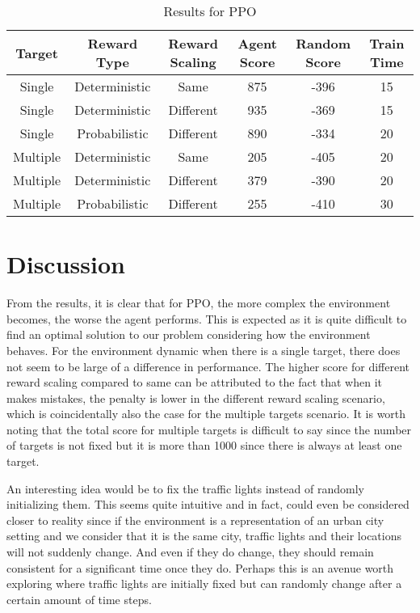 \documentclass{article}
\begin{document}
\begin{table*}[h]
	\centering
	\caption[]{Results for PPO}\label{Results for PPO}%
	\begin{tabular}{cccccc}
		\toprule
		Target & Reward Type & Reward Scaling\footnotemark[1] & Agent Score\footnotemark[2] & Random Score\footnotemark[2] & Train Time\footnotemark[3]\\
		\midrule
		Single &  Deterministic & Same & 875 & -396 & 15\\
		Single & Deterministic & Different\footnotemark[4] & 935 & -369 & 15\\
		Single & Probabilistic & Different & 890 & -334 & 20\\
		\midrule
		Multiple & Deterministic & Same & 205 & -405 & 20\\
		Multiple & Deterministic & Different & 379 & -390 & 20\\
		Multiple & Probabilistic & Different & 255 & -410 & 30\\
		\bottomrule
	\end{tabular}
	\label{tab: PPO_Table}
\end{table*}


\section{Discussion}
\label{discussion}
From the results, it is clear that for PPO, the more complex the environment becomes, the worse the agent performs. This is expected as it is quite difficult to find an optimal solution to our problem considering how the environment behaves. For the environment dynamic when there is a single target, there does not seem to be large of a difference in performance. The higher score for different reward scaling compared to same can be attributed to the fact that when it makes mistakes, the penalty is lower in the different reward scaling scenario, which is coincidentally also the case for the multiple targets scenario. It is worth noting that the total score for multiple targets is difficult to say since the number of targets is not fixed but it is more than 1000 since there is always at least one target.

An interesting idea would be to fix the traffic lights instead of randomly initializing them. This seems quite intuitive and in fact, could even be considered closer to reality since if the environment is a representation of an urban city setting and we consider that it is the same city, traffic lights and their locations will not suddenly change. And even if they do change, they should remain consistent for a significant time once they do. Perhaps this is an avenue worth exploring where traffic lights are initially fixed but can randomly change after a certain amount of time steps. 
\end{document}
